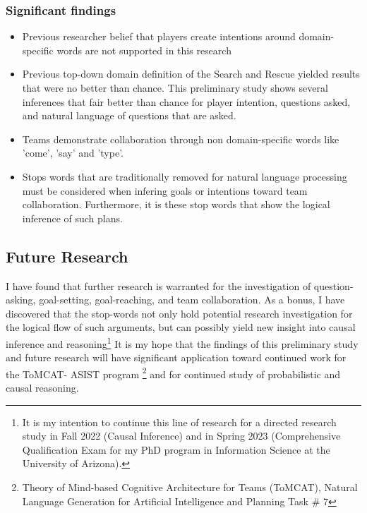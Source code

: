 \subsubsection{Significant findings}
\begin{itemize}
    \item Previous researcher belief that players create intentions around domain-specific words are not supported in this research
    \item Previous top-down domain definition of the Search and Rescue yielded results that were no better than chance. This preliminary study shows several inferences that fair better than chance for player intention, questions asked, and natural language of questions that are asked.
    \item Teams demonstrate collaboration through non domain-specific words like 'come', 'say' and 'type'.
    \item Stops words that are traditionally removed for natural language processing must be considered when infering goals or intentions toward team collaboration. Furthermore, it is these stop words that show the logical inference of such plans.
\end{itemize}


\subsection{Future Research}
I have found that further research is warranted for the investigation of question-asking, goal-setting, goal-reaching, and team collaboration. As a bonus, I have discovered that the stop-words not only hold potential research investigation for the logical flow of such arguments, but can possibly yield new insight into causal inference and reasoning\footnote{It is my intention to continue this line of research for a directed research study in Fall 2022 (Causal Inference) and in Spring 2023 (Comprehensive Qualification Exam for my PhD program in Information Science at the University of Arizona).} It is my hope that the findings of this preliminary study and future research will have significant application toward continued work for the ToMCAT- ASIST program \footnote{Theory of Mind-based Cognitive Architecture for Teams (ToMCAT), Natural Language Generation for Artificial Intelligence and Planning Task \# 7} and for continued study of probabilistic and causal reasoning. 

\newpage





